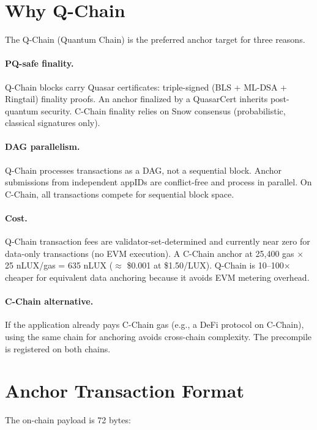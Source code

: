 \documentclass[11pt,a4paper]{article}
\begin{document}
\section{Why Q-Chain}
\label{sec:qchain}

The Q-Chain (Quantum Chain) is the preferred anchor target for three reasons.

\paragraph{PQ-safe finality.}
Q-Chain blocks carry Quasar certificates: triple-signed (BLS + ML-DSA +
Ringtail) finality proofs. An anchor finalized by a QuasarCert inherits
post-quantum security. C-Chain finality relies on Snow consensus
(probabilistic, classical signatures only).

\paragraph{DAG parallelism.}
Q-Chain processes transactions as a DAG, not a sequential block. Anchor
submissions from independent appIDs are conflict-free and process in
parallel. On C-Chain, all transactions compete for sequential block space.

\paragraph{Cost.}
Q-Chain transaction fees are validator-set-determined and currently near
zero for data-only transactions (no EVM execution). A C-Chain anchor at
25,400 gas $\times$ 25 nLUX/gas = 635 nLUX ($\approx$ \$0.001 at
\$1.50/LUX). Q-Chain is 10--100$\times$ cheaper for equivalent data
anchoring because it avoids EVM metering overhead.

\paragraph{C-Chain alternative.}
If the application already pays C-Chain gas (e.g., a DeFi protocol on
C-Chain), using the same chain for anchoring avoids cross-chain
complexity. The precompile is registered on both chains.

\section{Anchor Transaction Format}
\label{sec:format}

The on-chain payload is 72 bytes:
\end{document}
